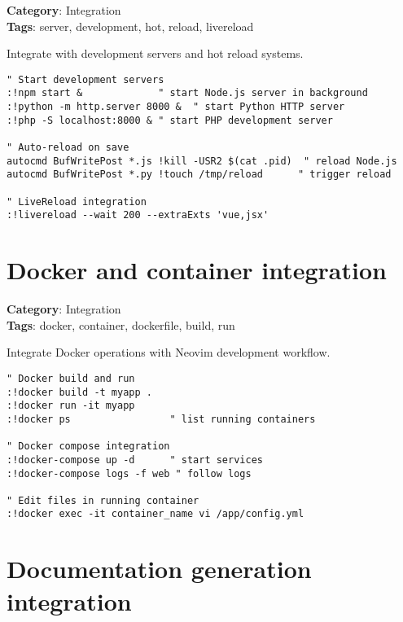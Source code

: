 {{{{{\textbf{Category}: Integration\\ \textbf{Tags}: server, development, hot, reload, livereload
\vspace{0.5cm}

Integrate with development servers and hot reload systems.

\begin{Exa*}{}
\begin{Verbatim}[fontsize=\footnotesize, breaklines, breakanywhere]
" Start development servers
:!npm start &             " start Node.js server in background
:!python -m http.server 8000 &  " start Python HTTP server
:!php -S localhost:8000 & " start PHP development server

" Auto-reload on save
autocmd BufWritePost *.js !kill -USR2 $(cat .pid)  " reload Node.js
autocmd BufWritePost *.py !touch /tmp/reload      " trigger reload

" LiveReload integration
:!livereload --wait 200 --extraExts 'vue,jsx'
\end{Verbatim}
\end{Exa*}

\section{Docker and container integration}

\textbf{Category}: Integration\\ \textbf{Tags}: docker, container, dockerfile, build, run
\vspace{0.5cm}

Integrate Docker operations with Neovim development workflow.

\begin{Exa*}{}
\begin{Verbatim}[fontsize=\footnotesize, breaklines, breakanywhere]
" Docker build and run
:!docker build -t myapp .
:!docker run -it myapp
:!docker ps                 " list running containers

" Docker compose integration
:!docker-compose up -d      " start services
:!docker-compose logs -f web " follow logs

" Edit files in running container
:!docker exec -it container_name vi /app/config.yml
\end{Verbatim}
\end{Exa*}

\section{Documentation generation integration}

}}}}}
